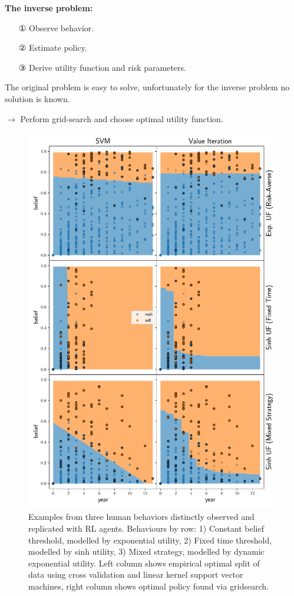 \textbf{The inverse problem:}
\begin{itemize}
\item[①] Observe behavior.
\item[②] Estimate policy.
\item[③] Derive utility function and risk parameters.
\end{itemize}

The original problem is easy to solve, unfortunately for the inverse problem no solution is known. 

$\rightarrow$ Perform grid-search and choose optimal utility function.

\begin{figure}
    \includegraphics[width=0.8\linewidth]{img/fit}
    \caption{Examples from three human behaviors distinctly observed and replicated with RL agents. Behaviours by row: 1) Constant belief threshold, modelled by exponential utility, 2) Fixed time threshold, modelled by sinh utility, 3) Mixed strategy, modelled by dynamic exponential utility. Left column shows empirical optimal split of data using cross validation and linear kernel support vector machines, right column shows optimal policy found via gridsearch.}
    \label{fig:svm_vs_value}
\end{figure}

